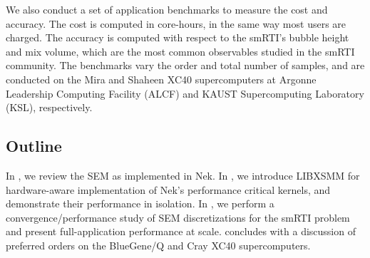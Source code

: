 We also conduct a set of application benchmarks to measure the cost and accuracy.
The cost is computed in core-hours, in the same way most users are charged.
The accuracy is computed with respect to the smRTI's bubble height and mix volume, which are the most common observables studied in the smRTI community.
The benchmarks vary the order and total number of samples, and are conducted on the Mira and Shaheen XC40 supercomputers at Argonne Leadership Computing Facility (ALCF) and KAUST Supercomputing Laboratory (KSL), respectively.


\subsection{Outline}
In , we review the SEM as implemented in Nek.
In , we introduce LIBXSMM for hardware-aware implementation of Nek's performance critical kernels, and demonstrate their performance in isolation.
In , we perform a convergence/performance study of SEM discretizations for the smRTI problem and present full-application performance at scale.
 concludes with a discussion of preferred orders on the BlueGene/Q and Cray XC40 supercomputers. 

